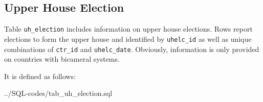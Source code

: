 \subsection{Upper House Election}\label{subsec_tab_uh_election}
Table  \texttt{\footnotesize uh\_election} includes information on upper house elections. 
Rows report elections to form the upper house and identified by \texttt{\footnotesize uhelc\_id} as well as unique combinations of \texttt{\footnotesize ctr\_id} and \texttt{\footnotesize uhelc\_date}. 
Obviously, information is only provided on countries with bicameral systems.

It is defined as follows:

%
{../SQL-codes/tab_uh_election.sql}
